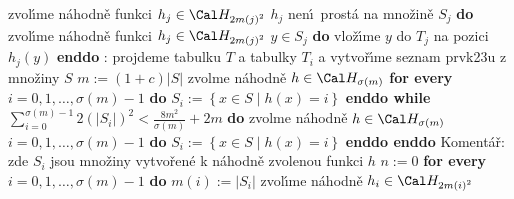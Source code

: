 \phantom{------------}zvol\'\i me n\'ahodn\v e funkci $
h_j\in \Cal H_{2m\left(j\right)^2}$\newline
\phantom{------------}{\bf while} $h_j$ nen\'\i\ prost\'a na mno\v zin\v e $
S_j$ {\bf do}\newline
\phantom{---------------}zvol\'\i me n\'ahodn\v e funkci $h_j\in \Cal H_{2m\left(j\right)^2}$\newline
\phantom{------------}{\bf enddo}\newline
\phantom{------------}{\bf for every} $y\in S_j$ {\bf do} vlo\v z\'\i me $
y$ do $T_j$ na pozici $h_j\left(y\right)$ {\bf enddo}\newline 
\phantom{---------}{\bf endif}\newline 
\phantom{------}{\bf endif}\newline 
\phantom{---}{\bf else}\newline 
\phantom{------}{\bf RehashAll}\newline
\phantom{---}{\bf endif\newline 
endif
\bigskip

\flushpar RehashAll}:\newline 
projdeme tabulku $T$ a tabulky $T_i$ a vytvo\v r\'\i me seznam 
prvk\accent23u z mno\v ziny $S$\newline 
$m:=\left(1+c\right)|S|$\newline 
zvolme n\'ahodn\v e $h\in \Cal H_{\sigma \left(m\right)}$ \newline 
{\bf for every} $i=0,1,\dots,\sigma \left(m\right)-1$ {\bf do} $S_i:=\left\{x\in S\mid h\left(x\right)=i\right\}$ {\bf enddo\newline
while} $\sum_{i=0}^{\sigma \left(m\right)-1}2\left(|S_i|\right)^2<\frac {8m^2}{\sigma \left(
m\right)}+2m$ {\bf do}\newline
\phantom{---}zvolme n\'ahodn\v e $h\in \Cal H_{\sigma \left(m\right)}$ \newline 
\phantom{---}{\bf for every} $i=0,1,\dots,\sigma \left(m\right)-1$ {\bf do} $S_i:=\left\{x\in S\mid h\left(x\right)=i\right\}$ {\bf enddo\newline
enddo}
Koment\'a\v r: zde $S_i$ jsou mno\v ziny vytvo\v ren\'e k n\'ahodn\v e zvolenou 
funkci $h$ \newline 
$n:=0$ \newline 
{\bf for every} $i=0,1,\dots,\sigma \left(m\right)-1$ {\bf do}\newline
\phantom{---}$m\left(i\right):=|S_i|$\newline 
\phantom{---}zvol\'\i me n\'ahodn\v e $h_i\in \Cal H_{2m\left(i\right)^2}$\newline 
